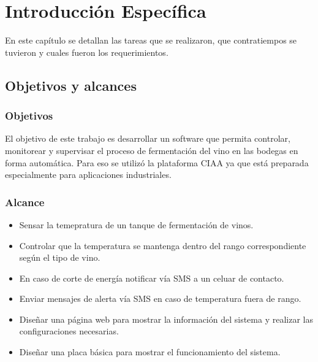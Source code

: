 \chapter{Introducción Específica} %

\label{Chapter2}
%
En este capítulo se detallan las tareas que se realizaron, que contratiempos se tuvieron y cuales fueron los requerimientos.

\section{Objetivos y alcances}

\subsection*{Objetivos}
    El objetivo de este trabajo es desarrollar un software que permita controlar, monitorear y supervisar el proceso de fermentación del vino en las bodegas en forma automática. Para eso se utilizó la plataforma CIAA ya que está preparada especialmente para aplicaciones industriales.
\subsection*{Alcance}
  \begin{itemize}
      \item Sensar la temepratura de un tanque de fermentación de vinos.
      \item Controlar que la temperatura se mantenga dentro del rango correspondiente según el tipo de vino. 
      \item En caso de corte de energía notificar vía SMS a un celuar de contacto.
      \item Enviar mensajes de alerta vía SMS en caso de temperatura fuera de rango.
      \item Diseñar una página web para mostrar la información del sistema y realizar las configuraciones necesarias.
      \item Diseñar una placa básica para mostrar el funcionamiento del sistema.
  \end{itemize}

